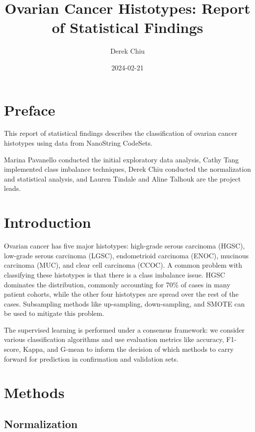 \documentclass[
]{report}
\title{Ovarian Cancer Histotypes: Report of Statistical Findings}
\author{Derek Chiu}
\date{2024-02-21}
\begin{document}
\maketitle

{
\hypersetup{linkcolor=}
\setcounter{tocdepth}{1}
\tableofcontents
}
\listoffigures
\listoftables
\hypertarget{preface}{%
\chapter*{Preface}\label{preface}}

This report of statistical findings describes the classification of ovarian cancer histotypes using data from NanoString CodeSets.

Marina Pavanello conducted the initial exploratory data analysis, Cathy Tang implemented class imbalance techniques, Derek Chiu conducted the normalization and statistical analysis, and Lauren Tindale and Aline Talhouk are the project leads.

\hypertarget{introduction}{%
\chapter{Introduction}\label{introduction}}

Ovarian cancer has five major histotypes: high-grade serous carcinoma (HGSC), low-grade serous carcinoma (LGSC), endometrioid carcinoma (ENOC), mucinous carcinoma (MUC), and clear cell carcinoma (CCOC). A common problem with classifying these histotypes is that there is a class imbalance issue. HGSC dominates the distribution, commonly accounting for 70\% of cases in many patient cohorts, while the other four histotypes are spread over the rest of the cases. Subsampling methods like up-sampling, down-sampling, and SMOTE can be used to mitigate this problem.

The supervised learning is performed under a consensus framework: we consider various classification algorithms and use evaluation metrics like accuracy, F1-score, Kappa, and G-mean to inform the decision of which methods to carry forward for prediction in confirmation and validation sets.

\hypertarget{methods}{%
\chapter{Methods}\label{methods}}

\hypertarget{normalization}{%
\section{Normalization}\label{normalization}}
\end{document}
